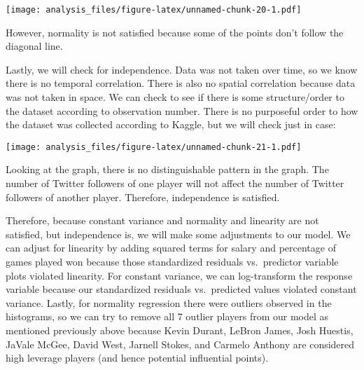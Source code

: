 \documentclass[]{article}
\newenvironment{Shaded}{\begin{snugshade}}{\end{snugshade}}
\newcommand{\DataTypeTok}[1]{\textcolor[rgb]{0.13,0.29,0.53}{#1}}
\newcommand{\DecValTok}[1]{\textcolor[rgb]{0.00,0.00,0.81}{#1}}
\newcommand{\FloatTok}[1]{\textcolor[rgb]{0.00,0.00,0.81}{#1}}
\newcommand{\KeywordTok}[1]{\textcolor[rgb]{0.13,0.29,0.53}{\textbf{#1}}}
\newcommand{\NormalTok}[1]{#1}
\newcommand{\OperatorTok}[1]{\textcolor[rgb]{0.81,0.36,0.00}{\textbf{#1}}}
\newcommand{\StringTok}[1]{\textcolor[rgb]{0.31,0.60,0.02}{#1}}
\begin{document}
\texttt{[image: analysis\_files/figure-latex/unnamed-chunk-20-1.pdf]}

However, normality is not satisfied because some of the points don't
follow the diagonal line.

Lastly, we will check for independence. Data was not taken over time, so
we know there is no temporal correlation. There is also no spatial
correlation because data was not taken in space. We can check to see if
there is some structure/order to the dataset according to observation
number. There is no purposeful order to how the dataset was collected
according to Kaggle, but we will check just in case:

\begin{Shaded}
\end{Shaded}

\texttt{[image: analysis\_files/figure-latex/unnamed-chunk-21-1.pdf]}

Looking at the graph, there is no distinguishable pattern in the graph.
The number of Twitter followers of one player will not affect the number
of Twitter followers of another player. Therefore, independence is
satisfied.

Therefore, because constant variance and normality and linearity are not
satisfied, but independence is, we will make some adjustments to our
model. We can adjust for linearity by adding squared terms for salary
and percentage of games played won because those standardized residuals
vs.~predictor variable plots violated linearity. For constant variance,
we can log-transform the response variable because our standardized
residuals vs.~predicted values violated constant variance. Lastly, for
normality regression there were outliers observed in the histograms, so
we can try to remove all 7 outlier players from our model as mentioned
previously above because Kevin Durant, LeBron James, Josh Huestis,
JaVale McGee, David West, Jarnell Stokes, and Carmelo Anthony are
considered high leverage players (and hence potential influential
points).
\end{document}
